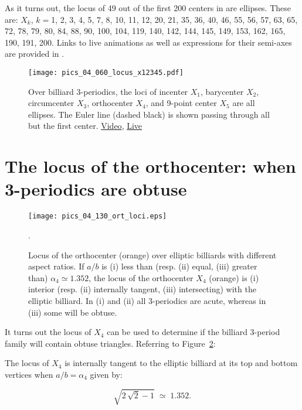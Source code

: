 As it turns out, the locus of 49 out of the first 200 centers in \cite{etc} are ellipses. These are: $X_k$, $k=$1,  2,  3,  4,  5,  7,  8,  10,  11,  12,  20,  21,  35,  36,  40,  46,  55,  56,  57,  63,  65,  72,  78,  79,  80,  84,  88,  90,  100,  104,  119,  140,  142,  144,  145,  149,  153,  162,  165,  190,  191,  200. Links to live animations as well as expressions for their semi-axes are provided in \cite{garcia2021-ellipses-web}.


\begin{figure}
\centering
\texttt{[image: pics\_04\_060\_locus\_x12345.pdf]}
\caption{Over billiard 3-periodics, the loci of incenter $X_1$, barycenter $X_2$, circumcenter $X_3$, orthocenter $X_4$, and 9-point center $X_5$ are all ellipses. The Euler line (dashed black) is shown passing through all but the first center. \href{https://youtu.be/sMcNzcYaqtg}{Video}, \href{https://bit.ly/3eVScgE}{Live}}
\label{fig:04-x12345}
\end{figure}

\section{The locus of the orthocenter: when 3-periodics are obtuse}

\begin{figure}
    \centering
    \texttt{[image: pics\_04\_130\_ort\_loci.eps]}
    \caption{Locus of the orthocenter (orange) over elliptic billiards with different aspect ratios. If $a/b$ is (i) less than (resp. (ii) equal, (iii) greater than) $\alpha_4{\simeq}1.352$, the locus of the orthocenter $X_4$ (orange) is (i) interior (resp. (ii) internally tangent, (iii) intersecting) with the elliptic billiard. In (i) and (ii) all 3-periodics are acute, whereas in (iii) some will be obtuse.}.
    \label{fig:04-orthocenter-loci}
\end{figure}

It turns out the locus of $X_4$ can be used to determine if the billiard 3-period family will contain obtuse triangles. Referring to Figure~\ref{fig:04-orthocenter-loci}:

\begin{proposition}
The locus of $X_4$ is internally tangent to the elliptic billiard at its top and bottom vertices when $a/b=\alpha_4$ given by:

\[\sqrt{2\,\sqrt {2}-1}\;{\simeq}\;1.352.\]
\end{proposition}

